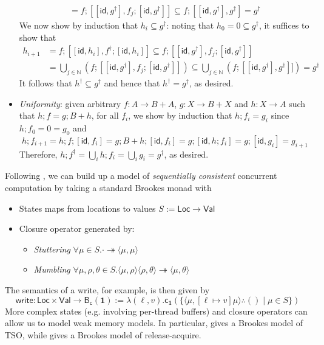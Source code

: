 \documentclass[acmsmall,screen,review]{acmart}
\newcommand{\mb}[1]{\ensuremath{\mathbf{#1}}}
\newcommand{\ms}[1]{\ensuremath{\mathsf{#1}}}
\newcommand{\nats}{\mathbb{N}}
\newcommand{\tret}[2]{#1 \therefore #2}
\newcommand{\tref}{\twoheadrightarrow}
\begin{document}
\begin{itemize}
\begin{align*}
    = f ; [[\ms{id}, g^\dagger], f_j ; [\ms{id}, g^\dagger]]
    \subseteq f ;  [[\ms{id}, g^\dagger], g^\dagger] = g^\dagger
  \end{align*}
  We now show by induction that $h_i \subseteq g^\dagger$: noting that $h_0 = 0
  \subseteq g^\dagger$, it suffices to show that
  \begin{align*}
  h_{i + 1} 
  & = f ; [[\ms{id}, h_i], f^\dagger ; [\ms{id}, h_i]] 
    \subseteq f ; [[\ms{id}, g^\dagger], f_j ; [\ms{id}, g^\dagger]] \\
  & = \bigcup_{j \in \nats}(f ; [[\ms{id}, g^\dagger], f_j ; [\ms{id}, g^\dagger]])
    \subseteq \bigcup_{j \in \nats}(f ; [[\ms{id}, g^\dagger], g^\dagger]])
    = g^\dagger
  \end{align*}
  It follows that $h^\dagger \subseteq g^\dagger$ and hence that $h^\dagger = g^\dagger$, as
  desired.
  \item \emph{Uniformity}: given arbitrary $f : A \to B + A$, $g : X \to B + X$ and $h : X \to A$
  such that $h ; f = g ; B + h$, for all $f_i$, we show by induction that $h ; f_i = g_i$ since $h ;
  f_0 = 0 = g_0$ and
  \begin{equation*}
  h ; f_{i + 1} = h ; f ; [\ms{id}, f_i] 
  = g ; B + h ; [\ms{id}, f_i]
  = g ; [\ms{id}, h ; f_i] = g ; [\ms{id}, g_i] = g_{i + 1}
  \end{equation*}
  Therefore, $h ; f^\dagger = \bigcup_i h ; f_i = \bigcup_i g_i = g^\dagger$, as desired.
\end{itemize}
Following \citet{brookes-full-abstraction-96}, we can build up a model of \emph{sequentially
consistent} concurrent computation by taking a standard Brookes monad with
\begin{itemize}
  \item States maps from locations to values $S := \ms{Loc} \to \ms{Val}$
  \item Closure operator generated by:
  \begin{itemize}
    \item \emph{Stuttering} $\forall \mu \in S . \cdot \tref \langle \mu, \mu \rangle$
    \item \emph{Mumbling} $\forall \mu, \rho, \theta \in S . 
      \langle \mu, \rho \rangle \langle \rho, \theta \rangle \tref \langle \mu, \theta \rangle$
  \end{itemize}
\end{itemize} 
The semantics of a write, for example, is then given by
\begin{equation*}
  \ms{write} : \ms{Loc} \times \ms{Val} \to \ms{B}_{\ms{c}}(\mb{1})
  := \lambda (\ell, v) . 
    \ms{c}_{\mb{1}}(\{\tret{\langle \mu, [\ell \mapsto v]\mu \rangle}{()} \mid \mu \in S\})
\end{equation*}
More complex states (e.g. involving per-thread buffers) and closure operators can allow us to model
weak memory models. In particular, \citet{jagadeesan-brookes-relaxed-12} gives a Brookes model of
TSO, while \citet{release-acquire} gives a Brookes model of release-acquire.
\end{document}

